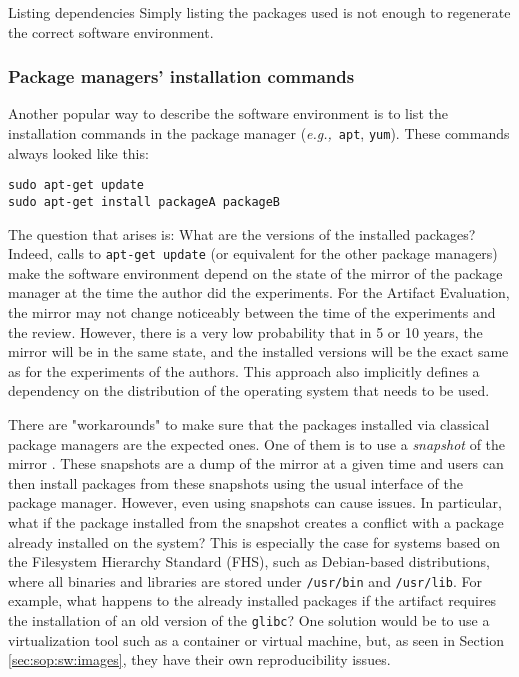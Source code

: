 \documentclass[sigconf,natbib=false]{acmart}
\newcommand{\eg}{\emph{e.g.,}}
\newcommand{\aeval}{Artifact Evaluation}
\begin{document}
\begin{lesson}{Listing dependencies}{}
  Simply listing the packages used is not enough to regenerate the correct software environment.
\end{lesson}

\subsubsection{Package managers' installation commands}

Another popular way to describe the software environment is to list the installation commands in the package manager (\eg\ \texttt{apt}, \texttt{yum}).
These commands always looked like this:

\begin{verbatim}
sudo apt-get update
sudo apt-get install packageA packageB
\end{verbatim}

The question that arises is: What are the versions of the installed packages?
Indeed, calls to \texttt{apt-get update} (or equivalent for the other package managers) make the software environment depend on the state of the mirror of the package manager at the time the author did the experiments.
For the \aeval, the mirror may not change noticeably between the time of the experiments and the review.
However, there is a very low probability that in 5 or 10 years, the mirror will be in the same state, and the installed versions will be the exact same as for the experiments of the authors.
This approach also implicitly defines a dependency on the distribution of the operating system that needs to be used.

There are "workarounds" to make sure that the packages installed via classical package managers are the expected ones. 
One of them is to use a \emph{snapshot} of the mirror \cite{debian-snapshot}.
These snapshots are a dump of the mirror at a given time and users can then install packages from these snapshots using the usual interface of the package manager.
However, even using snapshots can cause issues.
In particular, what if the package installed from the snapshot creates a conflict with a package already installed on the system?
This is especially the case for systems based on the Filesystem Hierarchy Standard (FHS), such as Debian-based distributions, where all binaries and libraries are stored under \texttt{/usr/bin} and \texttt{/usr/lib}.
For example, what happens to the already installed packages if the artifact requires the installation of an old version of the \texttt{glibc}? 
One solution would be to use a virtualization tool such as a container or virtual machine, but, as seen in Section \ref{sec:sop:sw:images}, they have their own reproducibility issues.
\end{document}
